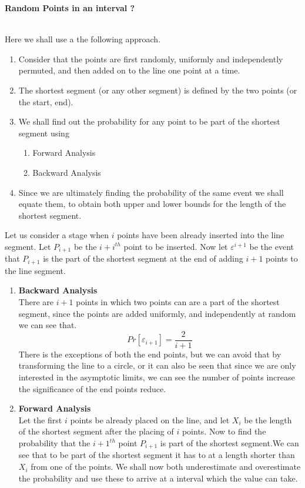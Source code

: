 \documentclass{assignment}
\date{October 20,2011}
\begin{document}
\begin{problemlist}
\pbitem
\begin{problem} 
\textbf{Random Points in an interval ?} \\
\begin{answer}
\\
Here we shall use a the following approach. 
\begin{enumerate}
 \item Consider that the points are first randomly, uniformly and independently permuted, and then added on to the line one point at a time. 
 \item The shortest segment (or any other segment) is defined by the two points (or the start, end). 
 \item We shall find out the probability for any point to be part of the shortest segment using
 \begin{enumerate}
  \item Forward Analysis
\item Backward Analysis
 \end{enumerate}
\item Since we are ultimately finding the probability of the same event we shall equate them, to obtain both upper and lower bounds for the length of the shortest segment. 
\end{enumerate}

Let us consider a stage when $i$ points have been already inserted into the line segment. Let $P_{i+1}$ be the $i+i^{th}$ point to be inserted. Now let $ \varepsilon ^ {i+1} $ be the event that $P_{i+1}$ is the part of the shortest segment at the end of adding $i+1$ points to the line segment. 

\begin{enumerate}
 \item \textbf{Backward Analysis} \\
There are $i+1$ points in which two points can are a part of the shortest segment, since the points are added uniformly, and independently at random we can see that. 
\begin{equation}
 Pr [ \varepsilon_{i+1} ] = \frac{2}{i+1}
\end{equation}
There is the exceptions of both the end points, but we can avoid that by transforming the line to a circle, or it can also be seen that since we are only interested in the asymptotic limits, we can see the number of points increase the significance of the end points reduce. 

\item \textbf{Forward Analysis} \\
Let the first $i$ points be already placed on the line, and let $X_i$ be the length of the shortest segment after the placing of $i$ points. Now to find the probability that the $i+1 ^ {th}$ point $P_{i+1}$ is part of the shortest segment.We can see that to be part of the shortest segment it has to at a length shorter than $X_i$ from one of the points. We shall now both underestimate and overestimate the probability and use these to arrive at a interval which the value can take. \\


\end{enumerate}
\end{answer}
\end{problem}
\end{problemlist}
\end{document}
